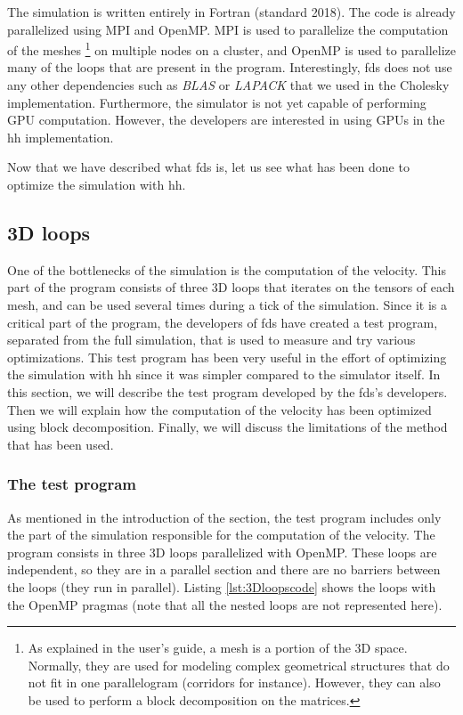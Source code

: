 The simulation is written entirely in Fortran (standard 2018). The code is
already parallelized using MPI and OpenMP. MPI is used to parallelize the
computation of the meshes \footnote{As explained in the user's guide, a mesh is a
portion of the 3D space. Normally, they are used for modeling complex geometrical
structures that do not fit in one parallelogram (corridors for instance).
However, they can also be used to perform a block decomposition on the
matrices.} on multiple nodes on a cluster, and OpenMP is used to parallelize
many of the loops that are present in the program. Interestingly, \gls{fds} does
not use any other dependencies such as \textit{BLAS} or \textit{LAPACK} that
we used in the Cholesky implementation. Furthermore, the simulator is not yet
capable of performing GPU computation. However, the developers are interested in
using GPUs in the \gls{hh} implementation.

Now that we have described what \gls{fds} is, let us see what has been done to
optimize the simulation with \gls{hh}.

\subsection{3D loops}

One of the bottlenecks of the simulation is the computation of the velocity.
This part of the program consists of three 3D loops that iterates on the tensors
of each mesh, and can be used several times during a tick of the simulation.
Since it is a critical part of the program, the developers of \gls{fds} have
created a test program, separated from the full simulation, that is used to
measure and try various optimizations. This test program has been very useful in
the effort of optimizing the simulation with \gls{hh} since it was simpler
compared to the simulator itself. In this section, we will describe the test
program developed by the \gls{fds}'s developers. Then we will explain how the
computation of the velocity has been optimized using block decomposition.
Finally, we will discuss the limitations of the method that has been used.

\subsubsection{The test program}

As mentioned in the introduction of the section, the test program includes
only the part of the simulation responsible for the computation of the velocity.
The program consists in three 3D loops parallelized with OpenMP. These loops
are independent, so they are in a parallel section and there are no barriers
between the loops (they run in parallel). Listing \ref{lst:3Dloopscode}
shows the loops with the OpenMP pragmas (note that all the nested loops are not
represented here).

